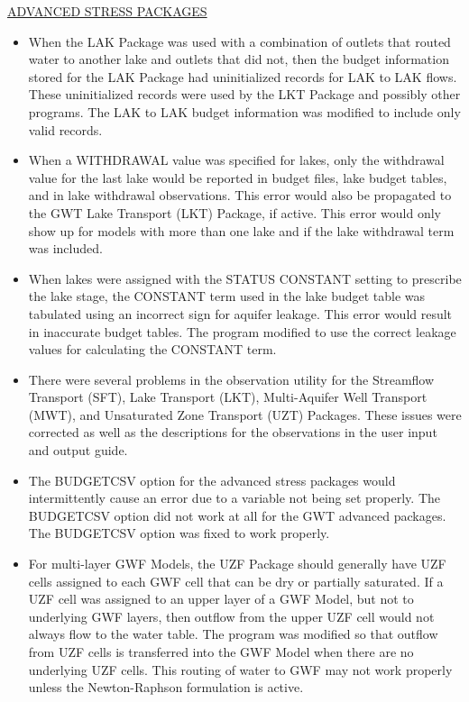\documentclass[11pt,twoside,twocolumn]{usgsreport}
\begin{document}
\begin{itemize}
	\underline{ADVANCED STRESS PACKAGES}
	\begin{itemize}
		\item When the LAK Package was used with a combination of outlets that routed water to another lake and outlets that did not, then the budget information stored for the LAK Package had uninitialized records for LAK to LAK flows.  These uninitialized records were used by the LKT Package and possibly other programs.  The LAK to LAK budget information was modified to include only valid records.
		\item When a WITHDRAWAL value was specified for lakes, only the withdrawal value for the last lake would be reported in budget files, lake budget tables, and in lake withdrawal observations.  This error would also be propagated to the GWT Lake Transport (LKT) Package, if active.  This error would only show up for models with more than one lake and if the lake withdrawal term was included.
		\item When lakes were assigned with the STATUS CONSTANT setting to prescribe the lake stage, the CONSTANT term used in the lake budget table was tabulated using an incorrect sign for aquifer leakage.  This error would result in inaccurate budget tables.  The program modified to use the correct leakage values for calculating the CONSTANT term.
		\item There were several problems in the observation utility for the Streamflow Transport (SFT), Lake Transport (LKT), Multi-Aquifer Well Transport (MWT), and Unsaturated Zone Transport (UZT) Packages.  These issues were corrected as well as the descriptions for the observations in the user input and output guide.
		\item The BUDGETCSV option for the advanced stress packages would intermittently cause an error due to a variable not being set properly.  The BUDGETCSV option did not work at all for the GWT advanced packages.  The BUDGETCSV option was fixed to work properly.
		\item For multi-layer GWF Models, the UZF Package should generally have UZF cells assigned to each GWF cell that can be dry or partially saturated.  If a UZF cell was assigned to an upper layer of a GWF Model, but not to underlying GWF layers, then outflow from the upper UZF cell would not always flow to the water table.  The program was modified so that outflow from UZF cells is transferred into the GWF Model when there are no underlying UZF cells.  This routing of water to GWF may not work properly unless the Newton-Raphson formulation is active.
	\end{itemize}


\end{itemize}
\end{document}
